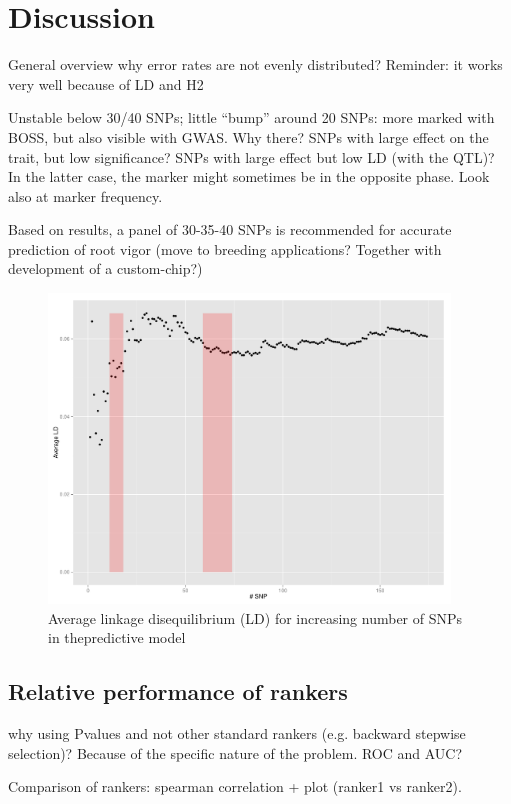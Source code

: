 \section{Discussion}
\label{sec:discussion}
General overview
why error rates are not evenly distributed?
Reminder: it works very well because of LD and H2

Unstable below 30/40 SNPs; little ``bump'' around 20 SNPs: more marked
with BOSS, but also visible with GWAS. Why there? SNPs with large effect
on the trait, but low significance? SNPs with large effect but low LD
(with the QTL)? In the latter case, the marker might sometimes be in the
opposite phase. Look also at marker frequency.

Based on results, a panel of 30-35-40 SNPs is recommended for accurate
prediction of root vigor (move to breeding applications? Together with
development of a custom-chip?)

\begin{figure}
\includegraphics[width=0.95\textwidth]{LD.pdf}
\caption{Average linkage disequilibrium (LD) for increasing number of
  SNPs in thepredictive model}
\label{fig:ld} 
\end{figure}

\subsection{Relative performance of rankers}
why using Pvalues and not other standard rankers (e.g. backward stepwise
selection)? Because of the specific nature of the problem. ROC and AUC?

Comparison of rankers: spearman correlation + plot (ranker1 vs ranker2).

